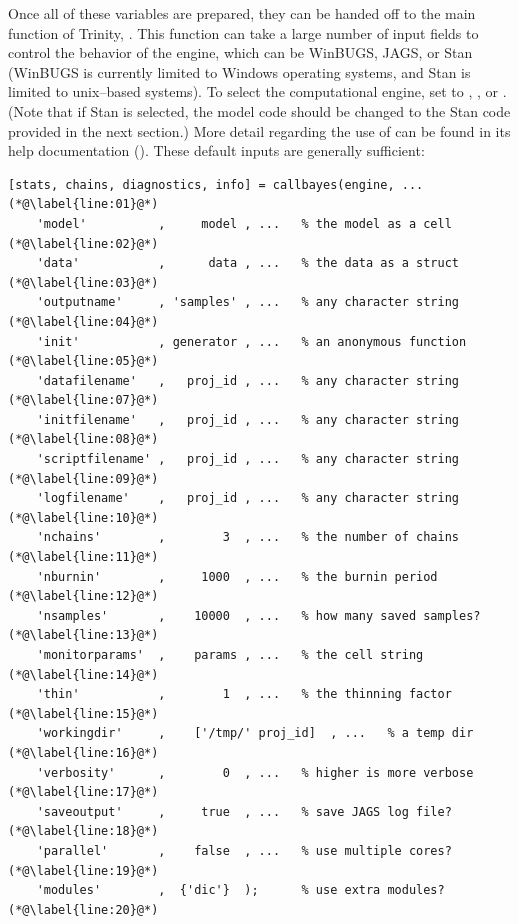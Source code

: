 Once all of these variables are prepared, they can be handed off to the main function of Trinity, . This function can take a large number of input fields to control the behavior of the engine, which can be WinBUGS, JAGS, or Stan (WinBUGS is currently limited to Windows operating systems, and Stan is limited to unix--based systems). To select the computational engine, set  to , , or . (Note that if Stan is selected, the model code should be changed to the Stan code provided in the next section.) More detail regarding the use of  can be found in its help documentation (). These default inputs are generally sufficient:

\lstset{numbers=left}
\begin{lstlisting}
[stats, chains, diagnostics, info] = callbayes(engine, ...         (*@\label{line:01}@*)
    'model'          ,     model , ...   % the model as a cell     (*@\label{line:02}@*)
    'data'           ,      data , ...   % the data as a struct    (*@\label{line:03}@*)
    'outputname'     , 'samples' , ...   % any character string    (*@\label{line:04}@*)
    'init'           , generator , ...   % an anonymous function   (*@\label{line:05}@*)
    'datafilename'   ,   proj_id , ...   % any character string    (*@\label{line:07}@*)
    'initfilename'   ,   proj_id , ...   % any character string    (*@\label{line:08}@*)
    'scriptfilename' ,   proj_id , ...   % any character string    (*@\label{line:09}@*)
    'logfilename'    ,   proj_id , ...   % any character string    (*@\label{line:10}@*)
    'nchains'        ,        3  , ...   % the number of chains    (*@\label{line:11}@*)
    'nburnin'        ,     1000  , ...   % the burnin period       (*@\label{line:12}@*)
    'nsamples'       ,    10000  , ...   % how many saved samples? (*@\label{line:13}@*)
    'monitorparams'  ,    params , ...   % the cell string         (*@\label{line:14}@*)
    'thin'           ,        1  , ...   % the thinning factor     (*@\label{line:15}@*)
    'workingdir'     ,    ['/tmp/' proj_id]  , ...   % a temp dir  (*@\label{line:16}@*)
    'verbosity'      ,        0  , ...   % higher is more verbose  (*@\label{line:17}@*)
    'saveoutput'     ,     true  , ...   % save JAGS log file?     (*@\label{line:18}@*)
    'parallel'       ,    false  , ...   % use multiple cores?     (*@\label{line:19}@*)
    'modules'        ,  {'dic'}  );      % use extra modules?      (*@\label{line:20}@*)
\end{lstlisting}
\lstset{numbers=none}

